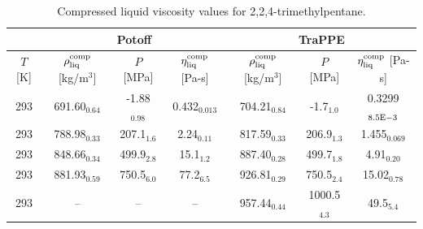 \documentclass[preprint,review,12pt]{elsarticle}
\begin{document}
\begin{landscape}
		\begin{table}[H]
			\caption{Compressed liquid viscosity values for 2,2,4-trimethylpentane.}
			\begin{center}
				\begin{tabular}{|c|c|c|c|c|c|c|}
					\hline
					& \multicolumn{3}{c|}{Potoff}                                                                         & \multicolumn{3}{c|}{TraPPE}                                                                          \\ \hline
					$T$ {[}K{]} & $\rho^{\rm comp}_{\rm liq}$ {[}kg/m$^3${]} & $P$ {[}MPa{]}  & $\eta^{\rm comp}_{\rm liq}$ {[}Pa-s{]} & $\rho^{\rm comp}_{\rm liq}$ {[}kg/m$^3${]} & $P$ {[}MPa{]}  & $\eta^{\rm comp}_{\rm liq}$ {[}Pa-s{]} \\ \hline
					293         & 691.60$_{0.64}$                            & -1.88$_{0.98}$ & 0.432$_{0.013}$                        & 704.21$_{0.84}$                         & -1.7$_{1.0}$   & 0.3299$_{8.5 \rm E-3}$                      \\ \hline
					293         & 788.98$_{0.33}$                            & 207.1$_{1.6}$  & 2.24$_{0.11}$                          & 817.59$_{0.33}$                         & 206.9$_{1.3}$  & 1.455$_{0.069}$                        \\ \hline
					293         & 848.66$_{0.34}$                            & 499.9$_{2.8}$  & 15.1$_{1.2}$                           & 887.40$_{0.28}$                         & 499.7$_{1.8}$  & 4.91$_{0.20}$                          \\ \hline
					293         & 881.93$_{0.59}$                            & 750.5$_{6.0}$  & 77.2$_{6.5}$                           & 926.81$_{0.29}$                         & 750.5$_{2.4}$  & 15.02$_{0.78}$                         \\ \hline
					293         & --                                          & --              & --                                      & 957.44$_{0.44}$                         & 1000.5$_{4.3}$ & 49.5$_{5.4}$                           \\ \hline
				\end{tabular}
			\end{center}
		\end{table}

\end{landscape}
\end{document}
